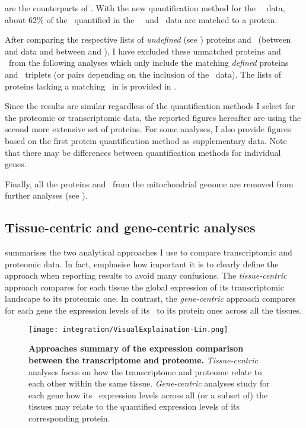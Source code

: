  are
the counterparts of .
With the new quantification method for the \pandey\ \etal\ data,
about 62\% of the \mRNAs\ quantified in the \uhlen\ \etal\ and \gtex\ data
are matched to a protein.

After comparing the respective lists of \emph{undefined} (see )
proteins and \mRNAs\ (between  and  data and
between  and ),
I have excluded these unmatched proteins and \mRNAs\ from the following analyses
which only include the matching \emph{defined} proteins and \mRNAs\ triplets
(or pairs depending on the inclusion of the \gtex\ data).
The lists of proteins lacking a matching \mRNAs\ in  is provided
in .

Since the results are similar regardless of the quantification methods I select
for the proteomic or transcriptomic data,
the reported figures hereafter are using
the second more extensive set of proteins.
For some analyses,
I also provide figures based on the first protein quantification method
as supplementary data.
Note that there may be differences between quantification methods for individual genes.

Finally, all the proteins and \mRNAs\ from the mitochondrial genome are removed
from further analyses
(see ).

\subsection{Tissue-centric and gene-centric analyses}

 summarises the two analytical approaches I use
to compare transcriptomic and proteomic data.
In fact,
\citet{Liu2016-re} emphasise how important it is to clearly define
the approach when reporting results to avoid many confusions.
The \emph{tissue-centric} approach compares for each tissue
the global expression of its transcriptomic landscape to its proteomic one.
In contrast,
the \emph{gene-centric} approach compares for each gene
the expression levels of its \mRNA\ to its protein ones across all the tissues.

\begin{figure}[!ht]
    \texttt{[image: integration/VisualExplaination-Lin.png]}\centering
    \caption[Summary of the expression comparison approaches between
    the transcriptome and proteome]{\label{fig:visualexp}\textbf{Approaches
    summary of the expression comparison between the transcriptome and proteome.}
    \emph{Tissue-centric} analyses focus on
    how the transcriptome and proteome relate to each other within the same tissue.
    \emph{Gene-centric} analyses study for each gene how its \mRNA\ expression
    levels across all (or a subset of) the tissues may relate to
    the quantified expression levels of its corresponding protein.
    }
\end{figure}


